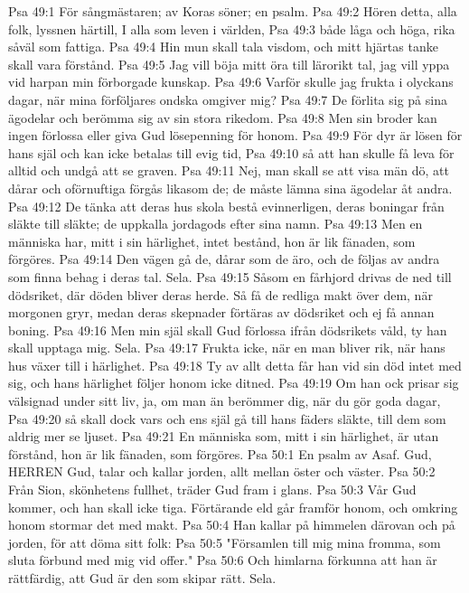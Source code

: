 Psa 49:1  För sångmästaren; av Koras söner; en psalm.
Psa 49:2  Hören detta, alla folk, lyssnen härtill, I alla som leven i världen,
Psa 49:3  både låga och höga, rika såväl som fattiga.
Psa 49:4  Hin mun skall tala visdom, och mitt hjärtas tanke skall vara förstånd.
Psa 49:5  Jag vill böja mitt öra till lärorikt tal, jag vill yppa vid harpan min förborgade kunskap.
Psa 49:6  Varför skulle jag frukta i olyckans dagar, när mina förföljares ondska omgiver mig?
Psa 49:7  De förlita sig på sina ägodelar och berömma sig av sin stora rikedom.
Psa 49:8  Men sin broder kan ingen förlossa eller giva Gud lösepenning för honom.
Psa 49:9  För dyr är lösen för hans själ och kan icke betalas till evig tid,
Psa 49:10  så att han skulle få leva för alltid och undgå att se graven.
Psa 49:11  Nej, man skall se att visa män dö, att dårar och oförnuftiga förgås likasom de; de måste lämna sina ägodelar åt andra.
Psa 49:12  De tänka att deras hus skola bestå evinnerligen, deras boningar från släkte till släkte; de uppkalla jordagods efter sina namn.
Psa 49:13  Men en människa har, mitt i sin härlighet, intet bestånd, hon är lik fänaden, som förgöres.
Psa 49:14  Den vägen gå de, dårar som de äro, och de följas av andra som finna behag i deras tal. Sela.
Psa 49:15  Såsom en fårhjord drivas de ned till dödsriket, där döden bliver deras herde. Så få de redliga makt över dem, när morgonen gryr, medan deras skepnader förtäras av dödsriket och ej få annan boning.
Psa 49:16  Men min själ skall Gud förlossa ifrån dödsrikets våld, ty han skall upptaga mig. Sela.
Psa 49:17  Frukta icke, när en man bliver rik, när hans hus växer till i härlighet.
Psa 49:18  Ty av allt detta får han vid sin död intet med sig, och hans härlighet följer honom icke ditned.
Psa 49:19  Om han ock prisar sig välsignad under sitt liv, ja, om man än berömmer dig, när du gör goda dagar,
Psa 49:20  så skall dock vars och ens själ gå till hans fäders släkte, till dem som aldrig mer se ljuset.
Psa 49:21  En människa som, mitt i sin härlighet, är utan förstånd, hon är lik fänaden, som förgöres.
Psa 50:1  En psalm av Asaf. Gud, HERREN Gud, talar och kallar jorden, allt mellan öster och väster.
Psa 50:2  Från Sion, skönhetens fullhet, träder Gud fram i glans.
Psa 50:3  Vår Gud kommer, och han skall icke tiga. Förtärande eld går framför honom, och omkring honom stormar det med makt.
Psa 50:4  Han kallar på himmelen därovan och på jorden, för att döma sitt folk:
Psa 50:5  "Församlen till mig mina fromma, som sluta förbund med mig vid offer."
Psa 50:6  Och himlarna förkunna att han är rättfärdig, att Gud är den som skipar rätt. Sela.
